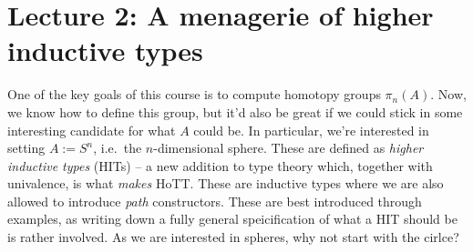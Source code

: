 \documentclass[10pt,oneside,leqno,openright]{memoir}
\begin{document}




\chapter*{Lecture 2: A menagerie of higher inductive types}


One of the key goals of this course is to compute homotopy groups $\pi_n(A)$. Now, we know how to define this group, but it'd also be great if we could stick in some interesting candidate for what $A$ could be.
%
In particular, we're interested in setting $A:=S^n$, i.e.\ the $n$-dimensional sphere.
%
These are defined as \emph{higher inductive types} (HITs) -- a new addition to type theory which, together with univalence, is what \emph{makes} HoTT.
%
These are inductive types where we are also allowed to introduce \emph{path} constructors.
%
These are best introduced through examples, as writing down a fully general speicification of what a HIT should be is rather involved. 
%
As we are interested in spheres, why not start with the cirlce?
%
\end{document}
